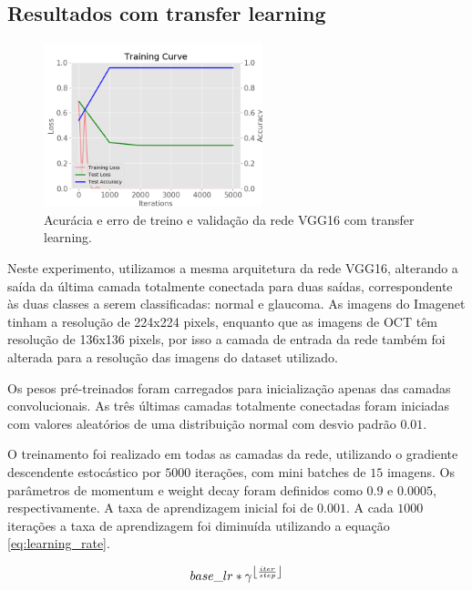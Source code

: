 \documentclass[conference]{IEEEtran}
\DeclarePairedDelimiter\floor{\lfloor}{\rfloor}
\begin{document}
  \subsection{Resultados com transfer learning}


  \begin{figure}[!tp]
    \centering
    \includegraphics[width=2.5in]{img/curve_vgg16.png}
    \caption{Acurácia e erro de treino e validação da rede VGG16 com transfer learning.}
    \label{fig:acuracia_vgg16_transfer}
  \end{figure}


  Neste experimento, utilizamos a mesma arquitetura da rede VGG16, alterando a saída da última camada totalmente conectada para duas saídas, correspondente às duas classes a serem classificadas: normal e glaucoma. As imagens do Imagenet tinham a resolução de 224x224 pixels, enquanto que as imagens de OCT têm resolução de 136x136 pixels, por isso a camada de entrada da rede também foi alterada para a resolução das imagens do dataset utilizado.
  
  Os pesos pré-treinados foram carregados para inicialização apenas das camadas convolucionais. As três últimas camadas totalmente conectadas foram iniciadas com valores aleatórios de uma distribuição normal com desvio padrão $0.01$.

  O treinamento foi realizado em todas as camadas da rede, utilizando o gradiente descendente estocástico por $5000$ iterações, com mini batches de $15$ imagens. Os parâmetros de momentum e weight decay foram definidos como $0.9$ e $0.0005$, respectivamente. A taxa de aprendizagem inicial foi de $0.001$. A cada $1000$ iterações a taxa de aprendizagem foi diminuída utilizando a equação \ref{eq:learning_rate}.

  \begin{equation}
    base\_lr * \gamma^{\floor*{\frac{iter}{step}}}
    \label{eq:learning_rate}
  \end{equation}
\end{document}

